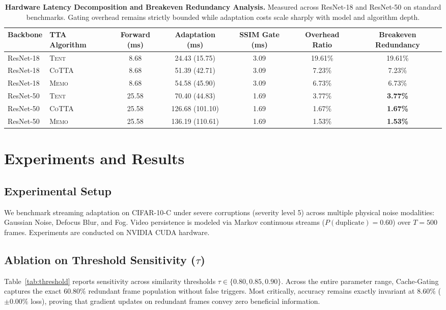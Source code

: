 \documentclass[10pt,twocolumn,letterpaper]{article}
\begin{document}
\begin{table}[t]
\centering
\caption{\textbf{Hardware Latency Decomposition and Breakeven Redundancy Analysis.} Measured across ResNet-18 and ResNet-50 on standard benchmarks. Gating overhead remains strictly bounded while adaptation costs scale sharply with model and algorithm depth.}
\label{tab:latency}
\small
\begin{tabular}{llccccc}
\toprule
\textbf{Backbone} & \textbf{TTA Algorithm} & \textbf{Forward (ms)} & \textbf{Adaptation (ms)} & \textbf{SSIM Gate (ms)} & \textbf{Overhead Ratio} & \textbf{Breakeven Redundancy} \\
\midrule
ResNet-18 & \textsc{Tent} & 8.68 & 24.43 (15.75) & 3.09 & 19.61\% & 19.61\% \\
ResNet-18 & \textsc{CoTTA} & 8.68 & 51.39 (42.71) & 3.09 & 7.23\% & 7.23\% \\
ResNet-18 & \textsc{Memo} & 8.68 & 54.58 (45.90) & 3.09 & 6.73\% & 6.73\% \\
\midrule
ResNet-50 & \textsc{Tent} & 25.58 & 70.40 (44.83) & 1.69 & 3.77\% & \textbf{3.77\%} \\
ResNet-50 & \textsc{CoTTA} & 25.58 & 126.68 (101.10) & 1.69 & 1.67\% & \textbf{1.67\%} \\
ResNet-50 & \textsc{Memo} & 25.58 & 136.19 (110.61) & 1.69 & 1.53\% & \textbf{1.53\%} \\
\bottomrule
\end{tabular}
\end{table}

\section{Experiments and Results}
\label{sec:experiments}

\subsection{Experimental Setup}
We benchmark streaming adaptation on CIFAR-10-C under severe corruptions (severity level 5) across multiple physical noise modalities: Gaussian Noise, Defocus Blur, and Fog. Video persistence is modeled via Markov continuous streams ($P(\text{duplicate}) = 0.60$) over $T=500$ frames. Experiments are conducted on NVIDIA CUDA hardware.

\subsection{Ablation on Threshold Sensitivity ($\tau$)}
Table~\ref{tab:threshold} reports sensitivity across similarity thresholds $\tau \in \{0.80, 0.85, 0.90\}$. Across the entire parameter range, Cache-Gating captures the exact $60.80\%$ redundant frame population without false triggers. Most critically, accuracy remains exactly invariant at $8.60\%$ ($\pm 0.00\%$ loss), proving that gradient updates on redundant frames convey zero beneficial information.
\end{document}
